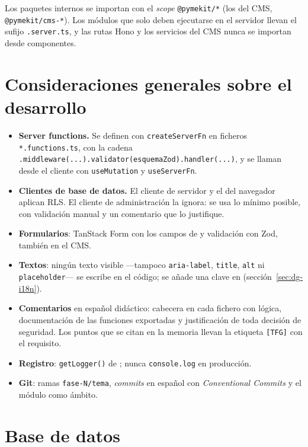 Los paquetes internos se importan con el \textit{scope} \texttt{@pymekit/*}
(los del CMS, \texttt{@pymekit/cms-*}). Los módulos que solo deben ejecutarse
en el servidor llevan el sufijo \texttt{.server.ts}, y las rutas Hono y los
servicios del CMS nunca se importan desde componentes.

\section{Consideraciones generales sobre el desarrollo}
\label{sec:dg-consideraciones}

\begin{itemize}
  \item \textbf{Server functions.} Se definen con \texttt{createServerFn} en
        ficheros \texttt{*.functions.ts}, con la cadena
        \texttt{.middleware(...).validator(esquemaZod).handler(...)}, y se
        llaman desde el cliente con \texttt{useMutation} y
        \texttt{useServerFn}.
  \item \textbf{Clientes de base de datos.} El cliente de servidor y el del
        navegador aplican RLS. El cliente de administración la ignora: se usa
        lo mínimo posible, con validación manual y un comentario que lo
        justifique.
  \item \textbf{Formularios}: TanStack Form con los campos de
         y validación con Zod, también en el CMS.
  \item \textbf{Textos}: ningún texto visible ---tampoco \texttt{aria-label},
        \texttt{title}, \texttt{alt} ni \texttt{placeholder}--- se escribe en
        el código; se añade una clave en
         (sección~\ref{sec:dg-i18n}).
  \item \textbf{Comentarios} en español didáctico: cabecera en cada fichero
        con lógica, documentación de las funciones exportadas y justificación
        de toda decisión de seguridad. Los puntos que se citan en la memoria
        llevan la etiqueta \texttt{[TFG]} con el requisito.
  \item \textbf{Registro}: \texttt{getLogger()} de
        ; nunca \texttt{console.log} en
        producción.
  \item \textbf{Git}: ramas \texttt{fase-N/tema}, \textit{commits} en español
        con \textit{Conventional Commits} y el módulo como ámbito.
\end{itemize}

\section{Base de datos}
\label{sec:dg-bd}

